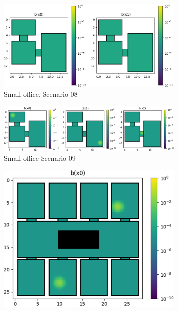 \begin{figure}\ContinuedFloat
    \centering
    \begin{subfigure}[b]{\textwidth}
        \includegraphics[width=\textwidth]{Report/images/scenarios/envsmall_sc08.png}
        \caption{Small office, Scenario 08}
        \label{subfig:sc08}
    \end{subfigure}
     \begin{subfigure}[b]{\textwidth}
        \includegraphics[width=\textwidth]{Report/images/scenarios/envsmall_sc09.png}
        \caption{Small office Scenario 09}
        \label{subfig:sc09}
    \end{subfigure}
    \centering
    \begin{subfigure}[c]{0.5\textwidth}
        \includegraphics[width=\textwidth]{Report/images/scenarios/envbig_sc01_a.png}

\end{subfigure}
\end{figure}
